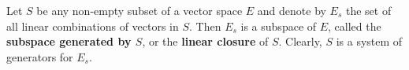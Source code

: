 Let $S$ be any non-empty subset of a vector space $E$ and denote by $E_s$ the set of all linear combinations of vectors in $S$. Then $E_s$ is a subspace of $E$, called the \textbf{subspace generated by $S$}, or the \textbf{linear closure} of $S$. Clearly, $S$ is a system of generators for $E_s$.
